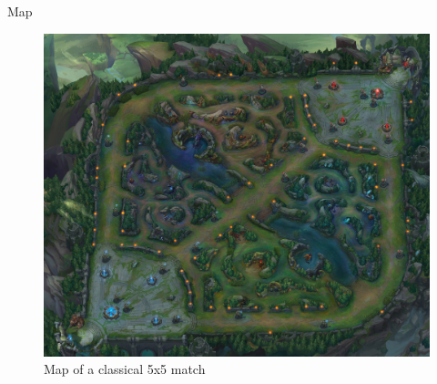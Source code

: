 \begin{frame}{Map}
\begin{figure}[h!]
\centering
\includegraphics[width=\linewidth, height=\textheight]{leagueoflegends/map}
\caption{Map of a classical 5x5 match}
\end{figure}
\end{frame}